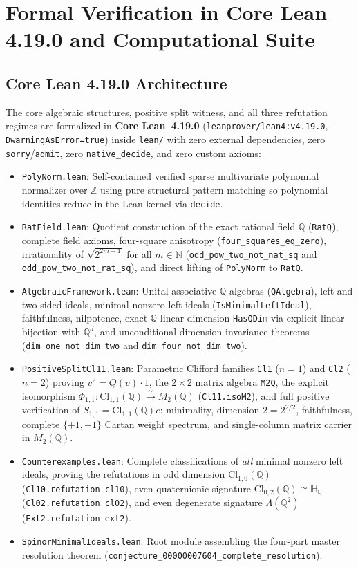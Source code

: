 \documentclass[11pt,a4paper]{article}
\theoremstyle{plain}
\theoremstyle{definition}
\theoremstyle{remark}
\newcommand{\Cl}{\mathrm{Cl}}
\begin{document}
\section{Formal Verification in Core Lean 4.19.0 and Computational Suite}

\subsection{Core Lean 4.19.0 Architecture}
The core algebraic structures, positive split witness, and all three refutation regimes are formalized in \textbf{Core Lean~4.19.0} (\texttt{leanprover/lean4:v4.19.0}, \texttt{-DwarningAsError=true}) inside \texttt{lean/} with zero external dependencies, zero \texttt{sorry}/\texttt{admit}, zero \texttt{native\_decide}, and zero custom axioms:
\begin{itemize}
  \item \texttt{PolyNorm.lean}: Self-contained verified sparse multivariate polynomial normalizer over $\mathbb{Z}$ using pure structural pattern matching so polynomial identities reduce in the Lean kernel via \texttt{decide}.
  \item \texttt{RatField.lean}: Quotient construction of the exact rational field $\mathbb{Q}$ (\texttt{RatQ}), complete field axioms, four-square anisotropy (\texttt{four\_squares\_eq\_zero}), irrationality of $\sqrt{2^{2m+1}}$ for all $m \in \mathbb{N}$ (\texttt{odd\_pow\_two\_not\_nat\_sq} and \texttt{odd\_pow\_two\_not\_rat\_sq}), and direct lifting of \texttt{PolyNorm} to \texttt{RatQ}.
  \item \texttt{AlgebraicFramework.lean}: Unital associative $\mathbb{Q}$-algebras (\texttt{QAlgebra}), left and two-sided ideals, minimal nonzero left ideals (\texttt{IsMinimalLeftIdeal}), faithfulness, nilpotence, exact $\mathbb{Q}$-linear dimension \texttt{HasQDim} via explicit linear bijection with $\mathbb{Q}^d$, and unconditional dimension-invariance theorems (\texttt{dim\_one\_not\_dim\_two} and \texttt{dim\_four\_not\_dim\_two}).
  \item \texttt{PositiveSplitCl11.lean}: Parametric Clifford families \texttt{Cl1} ($n = 1$) and \texttt{Cl2} ($n = 2$) proving $v^2 = Q(v)\cdot 1$, the $2\times 2$ matrix algebra \texttt{M2Q}, the explicit isomorphism $\Phi_{1,1} : \Cl_{1,1}(\mathbb{Q}) \xrightarrow{\sim} M_2(\mathbb{Q})$ (\texttt{Cl11.isoM2}), and full positive verification of $S_{1,1} = \Cl_{1,1}(\mathbb{Q}) e$: minimality, dimension $2 = 2^{2/2}$, faithfulness, complete $\{+1, -1\}$ Cartan weight spectrum, and single-column matrix carrier in $M_2(\mathbb{Q})$.
  \item \texttt{Counterexamples.lean}: Complete classifications of \emph{all} minimal nonzero left ideals, proving the refutations in odd dimension $\Cl_{1,0}(\mathbb{Q})$ (\texttt{Cl10.refutation\_cl10}), even quaternionic signature $\Cl_{0,2}(\mathbb{Q}) \cong \mathbb{H}_{\mathbb{Q}}$ (\texttt{Cl02.refutation\_cl02}), and even degenerate signature $\Lambda(\mathbb{Q}^2)$ (\texttt{Ext2.refutation\_ext2}).
  \item \texttt{SpinorMinimalIdeals.lean}: Root module assembling the four-part master resolution theorem (\texttt{conjecture\_00000007604\_complete\_resolution}).
\end{itemize}
\end{document}
